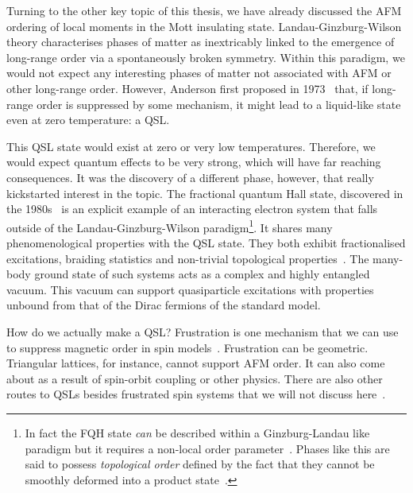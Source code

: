 Turning to the other key topic of this thesis, we have already discussed the AFM ordering of local moments in the Mott insulating state. Landau-Ginzburg-Wilson theory characterises phases of matter as inextricably linked to the emergence of long-range order via a spontaneously broken symmetry. Within this paradigm, we would not expect any interesting phases of matter not associated with AFM or other long-range order. However, Anderson first proposed in 1973~\autocite{Anderson1973} that, if long-range order is suppressed by some mechanism, it might lead to a liquid-like state even at zero temperature: a QSL.

This QSL state would exist at zero or very low temperatures. Therefore, we would expect quantum effects to be very strong, which will have far reaching consequences. It was the discovery of a different phase, however, that really kickstarted interest in the topic. The fractional quantum Hall state, discovered in the 1980s~\autocite{laughlinAnomalousQuantumHall1983} is an explicit example of an interacting electron system that falls outside of the Landau-Ginzburg-Wilson paradigm\footnote{In fact the FQH state \emph{can} be described within a Ginzburg-Landau like paradigm but it requires a non-local order parameter~\autocite{girvinOffdiagonalLongrangeOrder1987,readOrderParameterGinzburgLandau1989}. Phases like this are said to possess \emph{topological order} defined by the fact that they cannot be smoothly deformed into a product state~\autocite{chenLocalUnitaryTransformation2010,wenQuantumOrdersSymmetric2002}.}. It shares many phenomenological properties with the QSL state. They both exhibit fractionalised excitations, braiding statistics and non-trivial topological properties~\autocite{broholmQuantumSpinLiquids2020}. The many-body ground state of such systems acts as a complex and highly entangled vacuum. This vacuum can support quasiparticle excitations with properties unbound from that of the Dirac fermions of the standard model.

How do we actually make a QSL? Frustration is one mechanism that we can use to suppress magnetic order in spin models~\autocite{TrebstPhysRep2022}. Frustration can be geometric. Triangular lattices, for instance, cannot support AFM order. It can also come about as a result of spin-orbit coupling or other physics. There are also other routes to QSLs besides frustrated spin systems that we will not discuss here~\autocite{balentsNodalLiquidTheory1998,balentsDualOrderParameter1999,linExactSymmetryWeaklyinteracting1998}.

